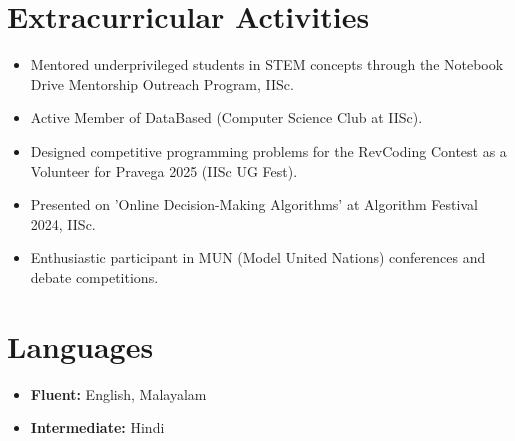 \documentclass[a4paper,10pt]{article}
\begin{document}
\section*{Extracurricular Activities}
\begin{itemize}
    \item Mentored underprivileged students in STEM concepts through the Notebook Drive Mentorship Outreach Program, IISc.
    \item Active Member of DataBased (Computer Science Club at IISc).
    \item Designed competitive programming problems for the RevCoding Contest as a Volunteer for Pravega 2025 (IISc UG Fest).
    \item Presented on 'Online Decision-Making Algorithms' at Algorithm Festival 2024, IISc.
    \item Enthusiastic participant in MUN (Model United Nations) conferences and debate competitions.
\end{itemize}

\section*{Languages}
\begin{itemize}
    \item \textbf{Fluent:} English, Malayalam
    \item \textbf{Intermediate:} Hindi
\end{itemize}
\end{document}
